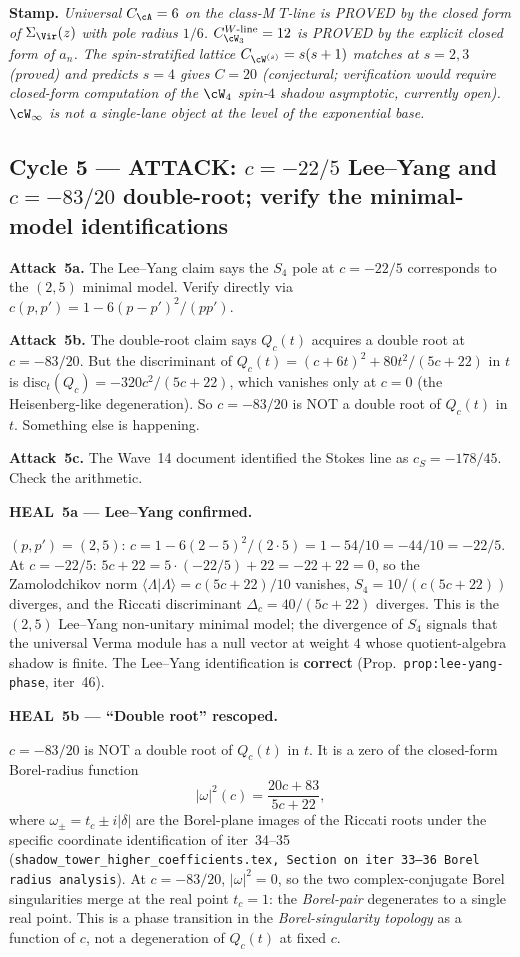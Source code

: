 \textbf{Stamp.} \emph{Universal $C_\cA = 6$ on the class-M $T$-line is
PROVED by the closed form of $\Sigma_\Vir(z)$ with pole radius $1/6$.
$C^{W\text{-line}}_{\cW_3} = 12$ is PROVED by the explicit closed form of
$a_n$. The spin-stratified lattice $C_{\cW^{(s)}} = s(s+1)$ matches at
$s = 2, 3$ (proved) and predicts $s = 4$ gives $C = 20$ (conjectural;
verification would require closed-form computation of the $\cW_4$ spin-$4$
shadow asymptotic, currently open). $\cW_\infty$ is not a single-lane
object at the level of the exponential base.}

\subsection*{Cycle 5 --- ATTACK: $c = -22/5$ Lee--Yang and $c = -83/20$ double-root; verify the minimal-model identifications}

\textbf{Attack~5a.} The Lee--Yang claim says the $S_4$ pole at $c = -22/5$
corresponds to the $(2,5)$ minimal model. Verify directly via
$c(p,p') = 1 - 6(p-p')^2/(pp')$.

\textbf{Attack~5b.} The double-root claim says $Q_c(t)$ acquires a double
root at $c = -83/20$. But the discriminant of $Q_c(t) = (c+6t)^2 + 80t^2/(5c+22)$
in $t$ is $\mathrm{disc}_t(Q_c) = -320 c^2/(5c+22)$, which vanishes only at
$c = 0$ (the Heisenberg-like degeneration). So $c = -83/20$ is NOT a
double root of $Q_c(t)$ in $t$. Something else is happening.

\textbf{Attack~5c.} The Wave~14 document identified the Stokes line as
$c_S = -178/45$. Check the arithmetic.

\textbf{HEAL~5a --- Lee--Yang confirmed.}

$(p, p') = (2, 5)$: $c = 1 - 6 (2-5)^2/(2 \cdot 5) = 1 - 54/10 = -44/10 = -22/5$.
At $c = -22/5$: $5c + 22 = 5 \cdot (-22/5) + 22 = -22 + 22 = 0$, so the
Zamolodchikov norm $\langle \Lambda | \Lambda \rangle = c(5c+22)/10$
vanishes, $S_4 = 10/(c(5c+22))$ diverges, and the Riccati discriminant
$\Delta_c = 40/(5c+22)$ diverges. This is the $(2,5)$ Lee--Yang non-unitary
minimal model; the divergence of $S_4$ signals that the universal Verma
module has a null vector at weight $4$ whose quotient-algebra shadow is
finite. The Lee--Yang identification is \textbf{correct}
(Prop.~\texttt{prop:lee-yang-phase}, iter~46).

\textbf{HEAL~5b --- ``Double root'' rescoped.}

$c = -83/20$ is NOT a double root of $Q_c(t)$ in $t$. It is a zero of the
closed-form Borel-radius function
\[
  |\omega|^2(c) = \frac{20c + 83}{5c + 22},
\]
where $\omega_\pm = t_c \pm i|\delta|$ are the Borel-plane images of the
Riccati roots under the specific coordinate identification of iter~34--35
(\texttt{shadow\_tower\_higher\_coefficients.tex, Section on iter~33--36
Borel radius analysis}). At $c = -83/20$, $|\omega|^2 = 0$, so the two
complex-conjugate Borel singularities merge at the real point $t_c = 1$:
the \emph{Borel-pair} degenerates to a single real point. This is a phase
transition in the \emph{Borel-singularity topology} as a function of $c$,
not a degeneration of $Q_c(t)$ at fixed $c$.


